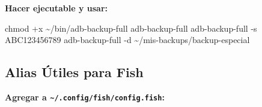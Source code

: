 \documentclass[
  doc,
  floatsintext,
  longtable,
  a4paper,
  nolmodern,
  notxfonts,
  notimes,
  12pt,
  colorlinks=true,linkcolor=blue,citecolor=blue,urlcolor=blue]{apa7}
\newenvironment{Shaded}{\begin{snugshade}}{\end{snugshade}}
\newcommand{\AttributeTok}[1]{\textcolor[rgb]{0.40,0.45,0.13}{#1}}
\newcommand{\ExtensionTok}[1]{\textcolor[rgb]{0.00,0.23,0.31}{#1}}
\newcommand{\FunctionTok}[1]{\textcolor[rgb]{0.28,0.35,0.67}{#1}}
\newcommand{\NormalTok}[1]{\textcolor[rgb]{0.00,0.23,0.31}{#1}}
\begin{document}
\textbf{Hacer ejecutable y usar:}

\begin{Shaded}
\begin{Highlighting}[]
\FunctionTok{chmod}\NormalTok{ +x \textasciitilde{}/bin/adb{-}backup{-}full}
\ExtensionTok{adb{-}backup{-}full}
\ExtensionTok{adb{-}backup{-}full} \AttributeTok{{-}s}\NormalTok{ ABC123456789}
\ExtensionTok{adb{-}backup{-}full} \AttributeTok{{-}d}\NormalTok{ \textasciitilde{}/mis{-}backups/backup{-}especial}
\end{Highlighting}
\end{Shaded}

\subsection{Alias Útiles para Fish}\label{alias-uxfatiles-para-fish}

\textbf{Agregar a \texttt{\textasciitilde{}/.config/fish/config.fish}:}
\end{document}
